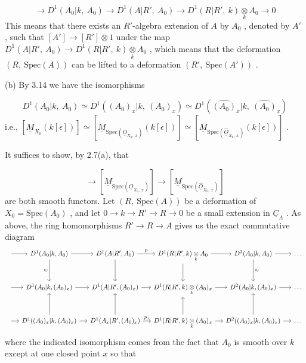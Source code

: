 \begin{equation*}
\to D^1(A_0|k,\ A_0) \to D^1(A|R',\ A_0) \to D^1(R|R',\ k) \underset{k}{\otimes} A_0 \to 0
\end{equation*}
This means that there exists an $R'$-algebra extension of  $A$  by  $A_0$  , denoted by $A'$  , such that  $[A'] \to [R'] \otimes 1$  under the map  $D^1(A|R',\ A_0) \to D^1(R|R',\ k) \underset{k}{\otimes} A_0$  , which means that the deformation  $(R,\ \mathrm{Spec}(A))$  can be lifted to a deformation $(R',\ \mathrm{Spec}(A'))$  .

(b)  By 3.14 we have the isomorphisms

\begin{equation*}
D^1(A_0|k,\ A_0) \simeq D^1((A_0)_x|k,\ (A_0)_x) \simeq D^1(\widehat{(A_0)}_x|k,\ \widehat{(A_0)}_x)
\end{equation*}
i.e.,   $[\underline{M}_{X_0}(k[\epsilon])] \simeq [\underline{M}_{\mathrm{Spec}(\underline{O}_{X_0,\ x})}(k[\epsilon])] \simeq [\underline{M}_{\mathrm{Spec}(\widehat{\underline{O}}_{X_0,\ x})}(k[\epsilon])]$ .

It suffices to show, by 2.7(a), that

\begin{equation*}
[\underline{M}_{X_0}] \to [\underline{M}_{\mathrm{Spec}(\underline{O}_{X_0,\ x})}] \to [\underline{M}_{\mathrm{Spec}(\widehat{\underline{O}}_{X_0,\ x})}]
\end{equation*}
are both smooth functors. Let  $(R,\ \mathrm{Spec}(A))$  be a deformation of  $X_0 = \mathrm{Spec}(A_0)$  , and let  $0 \to k \to R' \to R \to 0$  be a small extension in  $\underline{C}_{\Lambda}$  . As above, the ring homomorphisms  $R' \to R \to A$  gives us the exact commutative diagram
\[
\begin{tikzcd}[column sep=small, row sep=large]
{} \arrow[r] & D^1(A_0|k,A_0) \arrow[r] \arrow[d, "\approx"'] & D^1(A|R',A_0) \arrow[r, "p"] \arrow[d] & D^1(R|R',k)\underset{k}{\otimes}A_0 \arrow[r] \arrow[d] & D^2(A_0|k,A_0) \arrow[r] \arrow[d, "\approx"] & \dots \\
{} \arrow[r] & D^1(A_0|k,(A_0)_x) \arrow[r] & D^1(A|R',(A_0)_x) \arrow[r] & D^1(R|R',k)\underset{k}{\otimes}(A_0)_x \arrow[r] & D^2(A_0|k,(A_0)_x) \arrow[r] & \dots \\
{} \arrow[r] & D^1((A_0)_x|k,(A_0)_x) \arrow[r] \arrow[u] & D^1(A_x|R',(A_0)_x) \arrow[r, "p_x"] \arrow[u] & D^1(R|R',k)\underset{k}{\otimes}(A_0)_x \arrow[r] \arrow[u] & D^2((A_0)_x|k,(A_0)_x) \arrow[r] \arrow[u] & \dots
\end{tikzcd}
\]
where the indicated isomorphism comes from the fact that  $A_0$  is smooth over  $k$  except at one closed point  $x$  so that

